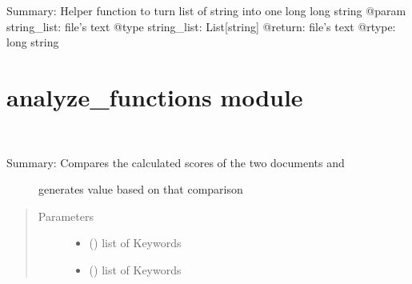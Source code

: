 \documentclass[letterpaper,10pt,english]{sphinxmanual}
\begin{document}

\begin{fulllineitems}
\label{\detokenize{functionsv1:common_functions.stringlisttolonglongstring}}
Summary: Helper function to turn list of string into one long long string
@param string\_list: file’s text
@type string\_list: List{[}string{]}
@return: file’s text
@rtype: long string

\end{fulllineitems}



\section{analyze\_functions module}
\label{\detokenize{functionsv1:analyze-functions-module}}\label{\detokenize{functionsv1:module-analyze_functions}}

\begin{fulllineitems}
\label{\detokenize{functionsv1:analyze_functions.calculatecomparisonscore}}~\begin{description}
\item[{Summary: Compares the calculated scores of the two documents and }] \leavevmode
generates value based on that comparison

\end{description}
\begin{quote}\begin{description}
\item[{Parameters}] \leavevmode\begin{itemize}
\item {} 
 ({\hyperref[\detokenize{KeywordList:module-KeywordList}]{}}) \textendash{} list of Keywords

\item {} 
 ({\hyperref[\detokenize{KeywordList:module-KeywordList}]{}}) \textendash{} list of Keywords

\end{itemize}

\end{description}\end{quote}

\end{fulllineitems}
\end{document}
